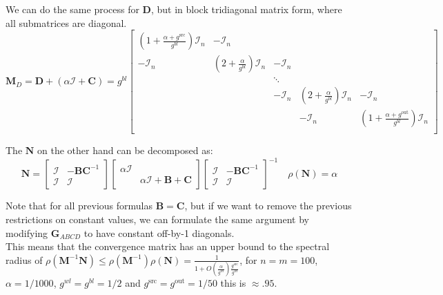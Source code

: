 \documentclass[journal,onecolumn]{IEEEtran}
\begin{document}
    We can do the same process for $\mathbf{D}$, but in block tridiagonal matrix form, where all submatrices are diagonal.
    $$\mathbf{M}^{}_{D} = \mathbf{D} + (\alpha \mathcal{I} + \mathbf{C}) = g^{bl}\begin{bmatrix}
        (1 + \frac{\alpha + g^\text{src}}{g^{bl}})\mathcal{I}_n & -\mathcal{I}_n \\
        -\mathcal{I}_n & (2 + \frac{\alpha}{g^{bl}})\mathcal{I}_n & -\mathcal{I}_n \\
        & & \ddots \\
        & & -\mathcal{I}_n & (2 + \frac{\alpha}{g^{bl}})\mathcal{I}_n & -\mathcal{I}_n \\
        & & & -\mathcal{I}_n & (1 + \frac{\alpha + g^\text{out}}{g^{bl}})\mathcal{I}_n \\
    \end{bmatrix}$$


    The $\mathbf{N}$ on the other hand can be decomposed as:
    $$\mathbf{N} = \begin{bmatrix} \mathcal{I} & -\mathbf{B}\mathbf{C}^{-1} \\ \mathcal{I} & \mathcal{I} \end{bmatrix} \begin{bmatrix} \alpha\mathcal{I} \\ & \alpha\mathcal{I} + \mathbf{B} + \mathbf{C} \end{bmatrix} \begin{bmatrix} \mathcal{I} & -\mathbf{B}\mathbf{C}^{-1} \\ \mathcal{I} & \mathcal{I} \end{bmatrix}^{-1} \quad \rho(\mathbf{N}) = \alpha$$
    
    Note that for all previous formulas $\mathbf{B} = \mathbf{C}$, but if we want to remove the previous restrictions on constant values, we can formulate the same argument by modifying $\mathbf{G}^{}_{ABCD}$ to have constant off-by-1 diagonals. \\  %
    
    This means that the convergence matrix has an upper bound to the spectral radius of $\rho(\mathbf{M}^{-1}\mathbf{N}) \le \rho(\mathbf{M}^{-1})\rho(\mathbf{N}) = \frac{1}{1 + O(\frac{\alpha}{g^{wl}})\frac{g^\text{src}}{g^{wl}}}$, for $n = m = 100$, $\alpha = 1/1000$, $g^{wl} = g^{bl} = 1/2$ and $g^\text{src} = g^\text{out} = 1/50$ this is $\approx .95$. \\
\fi
\end{document}
